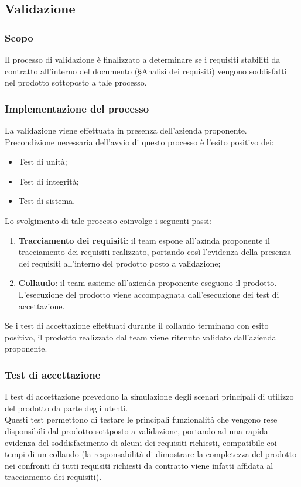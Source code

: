 \documentclass[10pt, a4paper]{article}
\begin{document}
\subsection{Validazione}
\subsubsection{Scopo}
Il processo di validazione è finalizzato a determinare se i requisiti stabiliti da contratto all'interno del documento (\S Analisi dei requisiti) vengono soddisfatti nel 
prodotto sottoposto a tale processo.

\subsubsection{Implementazione del processo}
La validazione viene effettuata in presenza dell'azienda proponente.\\
Precondizione necessaria dell'avvio di questo processo è l'esito positivo dei:
\begin{itemize}
    \item Test di unità;
    \item Test di integrità;
    \item Test di sistema.
\end{itemize}
Lo svolgimento di tale processo coinvolge i seguenti passi:
\begin{enumerate}
    \item \textbf{Tracciamento dei requisiti}: il team espone all'azinda proponente il tracciamento dei requisiti realizzato, portando così 
    l'evidenza della presenza dei requisiti all'interno del prodotto posto a validazione;
    \item \textbf{Collaudo}: il team assieme all'azienda proponente eseguono il prodotto. L'esecuzione del prodotto viene accompagnata 
    dall'esecuzione dei test di accettazione.
\end{enumerate}
Se i test di accettazione effettuati durante il collaudo terminano con esito positivo, il prodotto realizzato dal team viene ritenuto validato dall'azienda proponente.

\subsubsection{Test di accettazione}
I test di accettazione prevedono la simulazione degli scenari principali di utilizzo del prodotto da parte degli utenti.\\ 
Questi test permettono di testare le principali funzionalità che vengono rese disponsibili dal prodotto sottposto a validazione, portando ad una
rapida evidenza del soddisfacimento di alcuni dei requisiti richiesti, compatibile coi tempi di un collaudo (la responsabilità di dimostrare la completezza del 
prodotto nei confronti di tutti requisiti richiesti da contratto viene infatti affidata al tracciamento dei requisiti).
\end{document}
